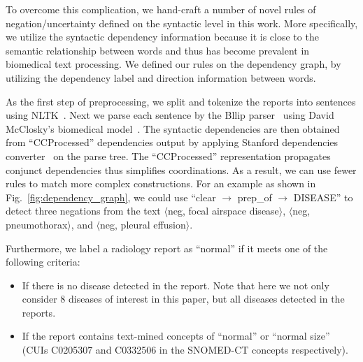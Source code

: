 \documentclass[10pt,twocolumn,letterpaper]{article}
\begin{document}
To overcome this complication, we hand-craft a number of novel rules of negation/uncertainty defined on the syntactic level in this work. More specifically, we utilize the syntactic dependency information because it is close to the semantic relationship between words and thus has become prevalent in biomedical text processing. We defined our rules on the dependency graph, by utilizing the dependency label and direction information between words. 

As the first step of preprocessing, we split and tokenize the reports into sentences using NLTK~\cite{bird2009natural}. Next we parse each sentence by the Bllip parser~\cite{charniak2005coarse} using David McClosky’s biomedical model~\cite{mcclosky2009any}. The syntactic dependencies are then obtained from ``CCProcessed'' dependencies output by applying Stanford dependencies converter~\cite{demarneffe2015stanford} on the parse tree. The ``CCProcessed'' representation propagates conjunct dependencies thus simplifies coordinations. As a result, we can use fewer rules to match more complex constructions. For an example as shown in Fig.~\ref{fig:dependency_graph}, we could use ``clear $\rightarrow$ prep\_of $\rightarrow$ DISEASE'' to detect three negations from the text $\langle$neg, focal airspace disease$\rangle$, $\langle$neg, pneumothorax$\rangle$, and $\langle$neg, pleural effusion$\rangle$.

Furthermore, we label a radiology report as ``normal'' if it meets one of the following criteria:
%
\begin{itemize}
	\item If there is no disease detected in the report. Note that here we not only consider 8 diseases of interest in this paper, but all diseases detected in the reports.
	\item If the report contains text-mined concepts of ``normal'' or ``normal size'' (CUIs C0205307 and C0332506  in the SNOMED-CT concepts respectively).
\end{itemize}
\end{document}
